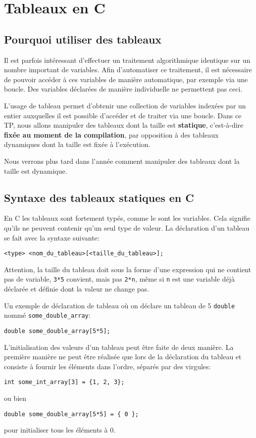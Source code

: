 \documentclass[11pt]{article}
\begin{document}
\section{Tableaux en C}
\label{sec:org89a082e}
\subsection{Pourquoi utiliser des tableaux}
\label{sec:org4419cce}
Il est parfois intéressant d'effectuer un traitement algorithmique identique sur un nombre important de variables. Afin d'automatiser ce traitement, il est nécessaire de pouvoir accéder à ces variables de manière automatique, par exemple via une boucle. Des variables déclarées de manière individuelle ne permettent pas ceci.

L'usage de tableau permet d'obtenir une collection de variables indexées par un entier auxquelles il est possible d'accéder et de traiter via une boucle.
Dans ce TP, nous allons manipuler des tableaux dont la taille est \textbf{statique}, c'est-à-dire \textbf{fixée au moment de la compilation}, par opposition à des tableaux dynamiques dont la taille est fixée à l'exécution.

Nous verrons plus tard dans l'année comment manipuler des tableaux dont la taille est dynamique.
\subsection{Syntaxe des tableaux statiques en C}
\label{sec:orgc51926c}
En C les tableaux sont fortement typés, comme le sont les variables. Cela signifie qu'ils ne peuvent contenir qu'un seul type de valeur.
La déclaration d'un tableau se fait avec la syntaxe suivante:
\begin{verbatim}
<type> <nom_du_tableau>[<taille_du_tableau>];
\end{verbatim}
Attention, la taille du tableau doit sous la forme d'une expression qui ne contient pas de variable, \texttt{3*5} convient, mais pas \texttt{2*n}, même si \texttt{n} est une variable déjà déclarée et définie dont la valeur ne change pas.

Un exemple de déclaration de tableau où on déclare un tableau de 5 \texttt{double} nommé \texttt{some\_double\_array}:
\begin{verbatim}
double some_double_array[5*5];
\end{verbatim}

L'initialisation des valeurs d'un tableau peut être faite de deux manière. La première manière ne peut être réalisée que lors de la déclaration du tableau et consiste à fournir les éléments dans l'ordre, séparés par des virgules:
\begin{verbatim}
int some_int_array[3] = {1, 2, 3};
\end{verbatim}
ou bien
\begin{verbatim}
double some_double_array[5*5] = { 0 };
\end{verbatim}
pour initialiser tous les éléments à 0.\\
\end{document}
